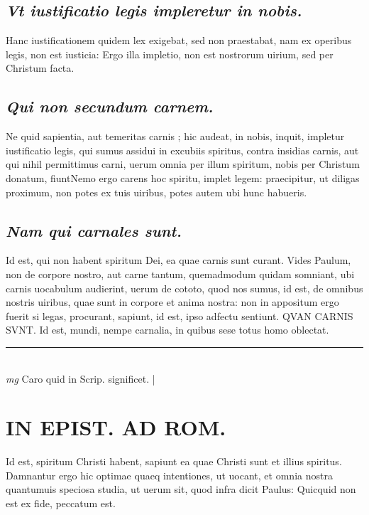 \documentclass{article}
\begin{document}
\begin{pages}
\subsection*{\textit{Vt iustificatio legis impleretur in nobis. }}\pstart Hanc iustificationem quidem lex exigebat, sed non praestabat, nam ex operibus legis, non est iusticia: Ergo illa impletio, non est nostrorum uirium, sed per Christum facta.   \pend
{}
{}
\subsection*{\textit{Qui non secundum carnem. }}\pstart Ne quid sapientia, aut temeritas carnis ; hic audeat, in nobis, inquit, impletur iustificatio legis, qui sumus assidui in excubiis spiritus, contra insidias carnis, aut qui nihil permittimus carni, uerum omnia per illum spiritum, nobis per Christum donatum, fiuntNemo ergo carens hoc spiritu, implet legem: praecipitur, ut diligas proximum, non potes ex tuis uiribus, potes autem ubi hunc habueris.   \pend
{}
{}
\subsection*{\textit{Nam qui carnales sunt. }}\pstart Id est, qui non habent spiritum Dei, ea quae carnis sunt curant. Vides Paulum, non de corpore nostro, aut carne tantum, quemadmodum quidam somniant, ubi carnis uocabulum audierint, uerum de cototo, quod nos sumus, id est, de omnibus nostris uiribus, quae sunt in corpore et anima nostra: non in appositum ergo fuerit si legas, procurant, sapiunt, id est, ipso adfectu sentiunt. QVAN CARNIS SVNT. Id est, mundi, nempe carnalia, in quibus sese totus homo oblectat.   \pend
\vspace{0.5cm}\noindent
\vspace{0.2cm}\rule{1cm}{0.2pt}\\ 
\hspace{0.2cm}\textit{mg}
\footnotesize Caro quid in Scrip. significet.  
\normalsize| 
\section*{IN EPIST. AD ROM.  }
\marginpar{[ p.84 ]}
\marginpar{[ p.]}\pstart Id est, spiritum Christi habent, sapiunt ea quae Christi sunt et illius spiritus. Damnantur ergo hic optimae quaeq intentiones, ut uocant, et omnia nostra quantumuis speciosa studia, ut uerum sit, quod infra dicit Paulus: Quicquid non est ex fide, peccatum est.   \pend
{}
{}

\end{pages}
\end{document}
